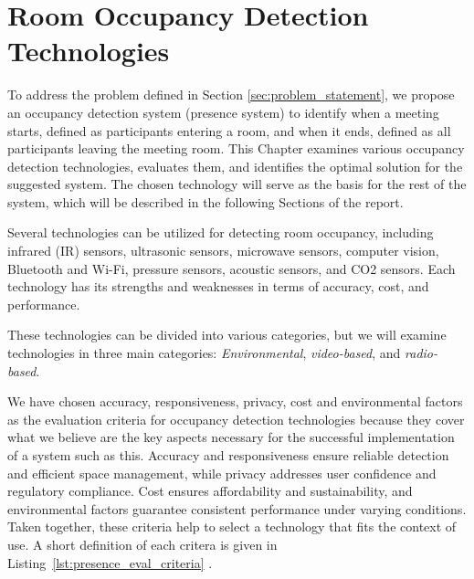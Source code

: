 \chapter{\label{sec:presence_intro}Room Occupancy Detection Technologies}

To address the problem defined in Section \ref{sec:problem_statement}, we propose an occupancy detection system (presence system) to identify when a meeting starts, defined as participants entering a room, and when it ends, defined as all participants leaving the meeting room.
This Chapter examines various occupancy detection technologies, evaluates them, and identifies the optimal solution for the suggested system.
The chosen technology will serve as the basis for the rest of the system, which will be described in the following Sections of the report.

Several technologies can be utilized for detecting room occupancy, including infrared (IR) sensors\cite{woodward-2021, dodierBuildingOccupancyDetection2006, OccupancySensorMotion}, ultrasonic sensors\cite{woodward-2021, dodierBuildingOccupancyDetection2006, OccupancySensorMotion}, microwave sensors\cite{woodward-2021}, computer vision\cite{co2sensor, longoAccurateOccupancyEstimation2019, OccupancySensorMotion}, Bluetooth and Wi-Fi\cite{teissedre-2019}, pressure sensors\cite{OccupancySensorMotion}, acoustic sensors\cite{OccupancySensorMotion}, and CO2 sensors\cite{co2sensor, longoAccurateOccupancyEstimation2019, jinSensingProxyOccupancy2015}.\cite{faragherLocationFingerprintingBluetooth2015}
Each technology has its strengths and weaknesses in terms of accuracy, cost, and performance.

These technologies can be divided into various categories, but we will examine technologies in three main categories: \textit{Environmental}, \textit{video-based}, and \textit{radio-based}.

We have chosen accuracy, responsiveness, privacy, cost and environmental factors as the evaluation criteria for occupancy detection technologies because they cover what we believe are the key aspects necessary for the successful implementation of a system such as this.
Accuracy and responsiveness ensure reliable detection and efficient space management, while privacy addresses user confidence and regulatory compliance.
Cost ensures affordability and sustainability, and environmental factors guarantee consistent performance under varying conditions.
Taken together, these criteria help to select a technology that fits the context of use.
A short definition of each critera is given in Listing~\ref{lst:presence_eval_criteria} .

